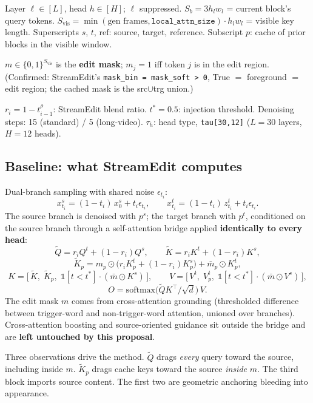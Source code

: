 \documentclass{article}
\begin{document}
Layer $\ell \in [L]$, head $h \in [H]$; $\ell$ suppressed. $S_b = 3 h_l w_l$ =
current block's query tokens. $S_{\mathrm{vis}} =
\min(\text{gen frames},\texttt{local\_attn\_size})\cdot h_l w_l$ = visible key
length. Superscripts $s$, $t$, $\mathrm{ref}$: source, target, reference.
Subscript $p$: cache of prior blocks in the visible window.

$m \in \{0,1\}^{S_{\mathrm{vis}}}$ is the \textbf{edit mask}; $m_j = 1$ iff
token $j$ is in the edit region. (Confirmed: StreamEdit's
\texttt{mask\_bin = mask\_soft > 0}, True $=$ foreground $=$ edit region; the
cached mask is the src$\cup$trg union.)

$r_i = 1 - t_{i-1}^{\rho}$: StreamEdit blend ratio. $t^{*} = 0.5$: injection
threshold. Denoising steps: 15 (standard) / 5 (long-video). $\tau_h$: head
type, \texttt{tau[30,12]} ($L = 30$ layers, $H = 12$ heads).

\subsection{Baseline: what StreamEdit computes}

Dual-branch sampling with shared noise $\epsilon_{t_i}$:
\[
  x^{s}_{t_i} = (1-t_i)\,x^{s}_0 + t_i \epsilon_{t_i}, \qquad
  x^{t}_{t_i} = (1-t_i)\,z^{t}_{t_i} + t_i \epsilon_{t_i}.
\]
The source branch is denoised with $p^{s}$; the target branch with $p^{t}$,
conditioned on the source branch through a self-attention bridge applied
\textbf{identically to every head}:
\[
  \tilde{Q} = r_i Q^{t} + (1-r_i) Q^{s}, \qquad
  \tilde{K} = r_i K^{t} + (1-r_i) K^{s},
\]
\[
  \tilde{K}_p = m_p \odot \big(r_i K^{t}_p + (1-r_i) K^{s}_p\big)
                + \bar m_p \odot K^{t}_p,
\]
\[
  K = \big[\,\tilde{K},\; \tilde{K}_p,\; \mathbb{1}[t<t^{*}]\cdot(\bar m \odot K^{s})\,\big],
  \qquad
  V = \big[\,V^{t},\; V^{t}_p,\; \mathbb{1}[t<t^{*}]\cdot(\bar m \odot V^{s})\,\big],
\]
\[
  O = \mathrm{softmax}\!\big(\tilde{Q}K^{\top}/\sqrt{d}\big)\,V .
\]
The edit mask $m$ comes from cross-attention grounding (thresholded difference
between trigger-word and non-trigger-word attention, unioned over branches).
Cross-attention boosting and source-oriented guidance sit outside the bridge and
are \textbf{left untouched by this proposal}.

Three observations drive the method. $\tilde{Q}$ drags \emph{every} query toward
the source, including inside $m$. $\tilde{K}_p$ drags cache keys toward the
source \emph{inside} $m$. The third block imports source content. The first two
are geometric anchoring bleeding into appearance.
\end{document}
